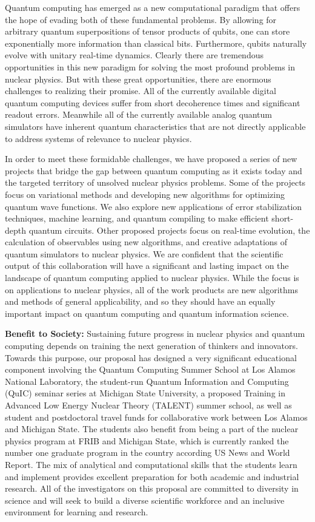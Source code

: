 \documentclass[aps,twocolumn,showpacs,floatfix,nofootinbib,preprintnumbers,superscriptaddress,amsmath,amssymb]{revtex4-1}
\begin{document}
Quantum computing has emerged as a new computational paradigm that offers the hope of evading both of these fundamental problems.  By allowing for arbitrary quantum superpositions of tensor products of qubits, one can store exponentially more information than classical bits.  Furthermore, qubits naturally evolve with unitary real-time dynamics. Clearly there are tremendous opportunities in this new paradigm for solving the most profound problems in nuclear physics.  But with these great opportunities, there are enormous challenges to realizing their promise.  All of the currently available digital quantum computing devices suffer from short decoherence times and significant readout errors.  Meanwhile all of the currently available analog quantum simulators have inherent quantum characteristics that are not directly applicable to address systems of relevance to nuclear physics.

In order to meet these formidable challenges, we have proposed a series of new projects that bridge the gap between quantum computing as it exists today and the targeted territory of unsolved nuclear physics problems.  Some of the projects focus on variational methods and developing new algorithms for optimizing quantum wave functions.  We also explore new applications of error stabilization techniques, machine learning, and quantum compiling to make efficient short-depth quantum circuits. Other proposed projects focus on real-time evolution, the calculation of observables using new algorithms, and creative adaptations of quantum simulators to nuclear physics.  We are confident that the scientific output of this collaboration will have a significant and lasting impact on the landscape of quantum computing applied to nuclear physics.  While the focus is on applications to nuclear physics, all of the work products are new algorithms and methods of general applicability, and so they should have an equally important impact on quantum computing and quantum information science.

{\bf Benefit to Society:}  Sustaining future progress in nuclear physics and quantum computing depends on training the next generation of thinkers and innovators.  Towards this purpose, our proposal has designed a very significant educational component involving the Quantum Computing Summer School at Los Alamos National Laboratory, the student-run Quantum Information and Computing (QuIC) seminar series at Michigan State University, a proposed Training in Advanced Low Energy Nuclear Theory (TALENT) summer school, as well as student and postdoctoral travel funds for collaborative work between Los Alamos and Michigan State.  The students also benefit from being a part of the nuclear physics program at FRIB and Michigan State, which is currently ranked the number one graduate program in the country according US News and World Report. The mix of analytical and computational skills that the students learn and implement provides excellent preparation for both academic and industrial research. All of the investigators on this proposal are committed to diversity in science and will seek to build a diverse scientific workforce and an inclusive environment for learning and research.
\end{document}
